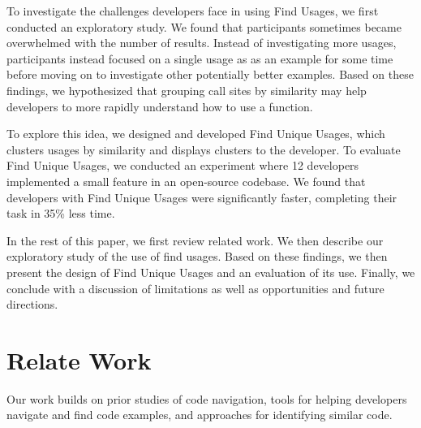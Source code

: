 \documentclass[conference]{IEEEtran}
\begin{document}


To investigate the challenges developers face in using Find Usages, we first conducted an exploratory study. We found that participants sometimes became overwhelmed with the number of results. Instead of investigating more usages, participants instead focused on a single usage as as an example for some time before moving on to investigate other potentially better examples.
Based on these findings, we hypothesized that grouping call sites by similarity may help developers to more rapidly understand how to use a function. \par

To explore this idea, we designed and developed Find Unique Usages, which clusters usages by similarity and displays clusters to the developer. 
To evaluate Find Unique Usages, we conducted  an  experiment where 12 developers implemented a small feature in an open-source codebase. We found that developers with Find Unique Usages were significantly faster, completing their task in 35\% less time.\par

In the rest of this paper, we first review related work. We then describe our exploratory study of the use of find usages. Based on these findings, we then present the design of Find Unique Usages and an evaluation of its use. Finally, we conclude with a discussion of limitations as well as opportunities and future directions.


\section{Relate Work}
Our work builds on prior studies of code navigation, tools for helping developers navigate and find code examples, and approaches for identifying similar code. 
\end{document}
